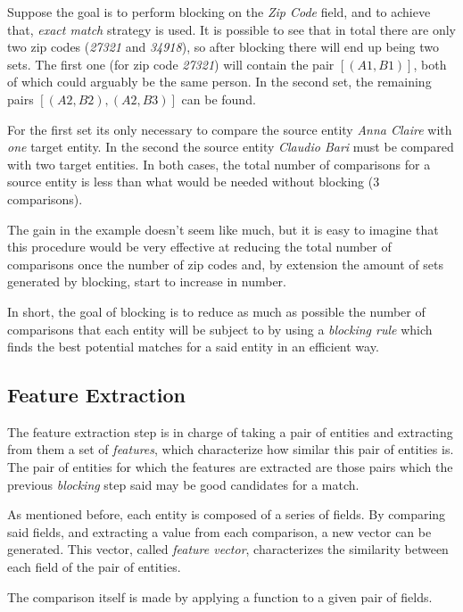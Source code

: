 \documentclass[epsfig,a4paper,11pt,titlepage,twoside,openany]{book}
\begin{document}
Suppose the goal is to perform blocking on the \textit{Zip Code} field, and to achieve that, 
\textit{exact match} strategy is used. It is possible to see that in total there are only two zip
codes (\textit{27321} and \textit{34918}), so after blocking there will end up being two sets. The first one (for zip code \textit{27321}) will contain the pair
$[(A1, B1)]$, both of which could arguably be the same person. In the second set, the remaining pairs $[(A2, B2), (A2, B3)]$ can be found.

For the first set its only necessary to compare the source entity \textit{Anna Claire}
with \textit{one} target entity. In the second the
source entity \textit{Claudio Bari} must be compared with two target entities. In both cases, the
total number of comparisons for a source entity is less than what would be needed
without blocking (3 comparisons).

The gain in the example doesn't seem like much, but it is easy to imagine that
this procedure would be very effective at reducing the total number of
comparisons once the number of zip codes and, by extension the amount of sets
generated by blocking, start to increase in number.

In short, the goal of blocking is to reduce as much as possible the number of
comparisons that each entity will be subject to by using a \textit{blocking
  rule} which finds the best potential matches for a said entity in an efficient
way.

  
\subsection{Feature Extraction}
\label{sec:rl-workflow-feat-extraction}

The feature extraction step is in charge of taking a pair of entities and
extracting from them a set of \textit{features}, which characterize how similar
this pair of entities is. The pair of entities for which the features are extracted
are those pairs which the previous \textit{blocking} step said may be good
candidates for a match.

As mentioned before, each entity is composed of a series of fields. By comparing said fields, and extracting a value from each comparison, a new vector can be generated. This vector, called \textit{feature vector}, characterizes the similarity between each field of the pair of entities.

The comparison itself is made by applying a function to a given pair of fields. 
\end{document}
